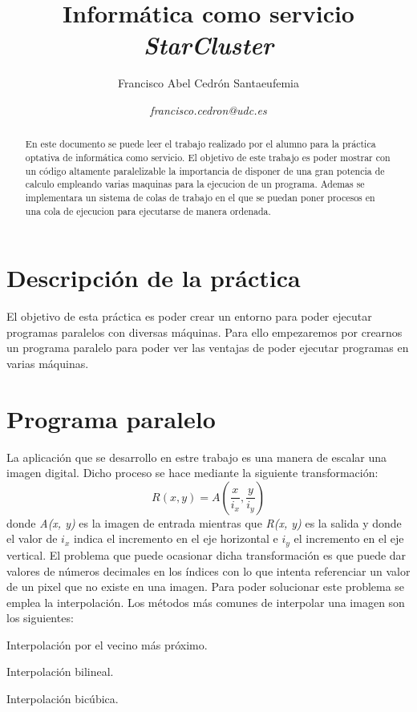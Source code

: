 \documentclass{article}
\title{\textbf{Informática como servicio}
\\ \textbf{\emph{StarCluster}}
}
\author{Francisco Abel Cedrón Santaeufemia \and \textit{francisco.cedron@udc.es}}
\date{} %
\begin{document}
\maketitle %
\renewcommand{\abstractname}{Abstract} %
\begin{abstract}
	En este documento se puede leer el trabajo realizado por el alumno para la práctica optativa de informática como servicio. El objetivo de este trabajo es poder mostrar con un código altamente paralelizable la importancia de disponer de una gran potencia de calculo empleando varias maquinas para la ejecucion de un programa. Ademas se implementara un sistema de colas de trabajo en el que se puedan poner procesos en una cola de ejecucion para ejecutarse de manera ordenada.
\end{abstract}
\renewcommand{\contentsname}{} %
{\setlength{\parskip}{0mm} \tableofcontents} %

\section{Descripción de la práctica}
	El objetivo de esta práctica es poder crear un entorno para poder ejecutar programas paralelos con diversas máquinas. Para ello empezaremos por crearnos un programa paralelo para poder ver las ventajas de poder ejecutar programas en varias máquinas.
	
\section{Programa paralelo}
{\setlength{\parskip}{0mm}
	La aplicación que se desarrollo en estre trabajo es una manera de escalar una imagen digital. Dicho proceso se hace mediante la siguiente transformación:
\begin{equation}
R(x, y) = A \left( \frac{x}{i_x}, \frac{y}{i_y} \right)
\end{equation}
donde \emph{A(x, y)} es la imagen de entrada mientras que \emph{R(x, y)} es la salida y donde el valor de $i_x$ indica el incremento en el eje horizontal 
e $i_y$ el incremento en el eje vertical. El problema que puede ocasionar dicha transformación es que puede dar valores de números decimales en 
los índices con lo que intenta referenciar un valor de un pixel que no existe en una imagen. Para poder solucionar este problema se emplea la interpolación. 
Los métodos más comunes de interpolar una imagen son los siguientes\cite{WOODS}:
\begin{enumerate} {\setlength{\parskip}{0mm}
	\item Interpolación por el vecino más próximo.
	\item Interpolación bilineal.
	\item Interpolación bicúbica.
} \end{enumerate}
}
\end{document}
